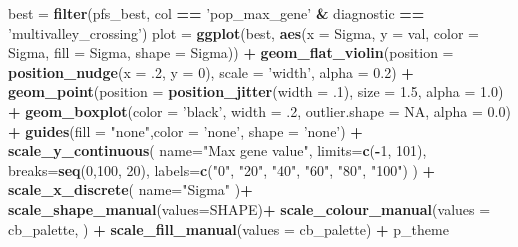 \documentclass[]{book}
\newenvironment{Shaded}{\begin{snugshade}}{\end{snugshade}}
\newcommand{\DataTypeTok}[1]{\textcolor[rgb]{0.13,0.29,0.53}{#1}}
\newcommand{\DecValTok}[1]{\textcolor[rgb]{0.00,0.00,0.81}{#1}}
\newcommand{\FloatTok}[1]{\textcolor[rgb]{0.00,0.00,0.81}{#1}}
\newcommand{\KeywordTok}[1]{\textcolor[rgb]{0.13,0.29,0.53}{\textbf{#1}}}
\newcommand{\NormalTok}[1]{#1}
\newcommand{\OperatorTok}[1]{\textcolor[rgb]{0.81,0.36,0.00}{\textbf{#1}}}
\newcommand{\OtherTok}[1]{\textcolor[rgb]{0.56,0.35,0.01}{#1}}
\newcommand{\StringTok}[1]{\textcolor[rgb]{0.31,0.60,0.02}{#1}}
\begin{document}
\begin{Shaded}
\begin{Highlighting}[]
\NormalTok{best =}\StringTok{ }\KeywordTok{filter}\NormalTok{(pfs_best, col }\OperatorTok{==}\StringTok{ 'pop_max_gene'} \OperatorTok{&}\StringTok{ }\NormalTok{diagnostic }\OperatorTok{==}\StringTok{ 'multivalley_crossing'}\NormalTok{)}
\NormalTok{plot =}\StringTok{  }\KeywordTok{ggplot}\NormalTok{(best, }\KeywordTok{aes}\NormalTok{(}\DataTypeTok{x =}\NormalTok{ Sigma, }\DataTypeTok{y =}\NormalTok{ val, }\DataTypeTok{color =}\NormalTok{ Sigma, }\DataTypeTok{fill =}\NormalTok{ Sigma, }\DataTypeTok{shape =}\NormalTok{ Sigma)) }\OperatorTok{+}
\StringTok{          }\KeywordTok{geom_flat_violin}\NormalTok{(}\DataTypeTok{position =} \KeywordTok{position_nudge}\NormalTok{(}\DataTypeTok{x =} \FloatTok{.2}\NormalTok{, }\DataTypeTok{y =} \DecValTok{0}\NormalTok{), }\DataTypeTok{scale =} \StringTok{'width'}\NormalTok{, }\DataTypeTok{alpha =} \FloatTok{0.2}\NormalTok{) }\OperatorTok{+}
\StringTok{          }\KeywordTok{geom_point}\NormalTok{(}\DataTypeTok{position =} \KeywordTok{position_jitter}\NormalTok{(}\DataTypeTok{width =} \FloatTok{.1}\NormalTok{), }\DataTypeTok{size =} \FloatTok{1.5}\NormalTok{, }\DataTypeTok{alpha =} \FloatTok{1.0}\NormalTok{) }\OperatorTok{+}
\StringTok{          }\KeywordTok{geom_boxplot}\NormalTok{(}\DataTypeTok{color =} \StringTok{'black'}\NormalTok{, }\DataTypeTok{width =} \FloatTok{.2}\NormalTok{, }\DataTypeTok{outlier.shape =} \OtherTok{NA}\NormalTok{, }\DataTypeTok{alpha =} \FloatTok{0.0}\NormalTok{) }\OperatorTok{+}
\StringTok{          }\KeywordTok{guides}\NormalTok{(}\DataTypeTok{fill =} \StringTok{"none"}\NormalTok{,}\DataTypeTok{color =} \StringTok{'none'}\NormalTok{, }\DataTypeTok{shape =} \StringTok{'none'}\NormalTok{) }\OperatorTok{+}
\StringTok{          }\KeywordTok{scale_y_continuous}\NormalTok{(}
          \DataTypeTok{name=}\StringTok{"Max gene value"}\NormalTok{,}
          \DataTypeTok{limits=}\KeywordTok{c}\NormalTok{(}\OperatorTok{-}\DecValTok{1}\NormalTok{, }\DecValTok{101}\NormalTok{),}
          \DataTypeTok{breaks=}\KeywordTok{seq}\NormalTok{(}\DecValTok{0}\NormalTok{,}\DecValTok{100}\NormalTok{, }\DecValTok{20}\NormalTok{),}
          \DataTypeTok{labels=}\KeywordTok{c}\NormalTok{(}\StringTok{"0"}\NormalTok{, }\StringTok{"20"}\NormalTok{, }\StringTok{"40"}\NormalTok{, }\StringTok{"60"}\NormalTok{, }\StringTok{"80"}\NormalTok{, }\StringTok{"100"}\NormalTok{)}
\NormalTok{          ) }\OperatorTok{+}
\StringTok{          }\KeywordTok{scale_x_discrete}\NormalTok{(}
            \DataTypeTok{name=}\StringTok{"Sigma"}
\NormalTok{          )}\OperatorTok{+}
\StringTok{          }\KeywordTok{scale_shape_manual}\NormalTok{(}\DataTypeTok{values=}\NormalTok{SHAPE)}\OperatorTok{+}
\StringTok{          }\KeywordTok{scale_colour_manual}\NormalTok{(}\DataTypeTok{values =}\NormalTok{ cb_palette, ) }\OperatorTok{+}
\StringTok{          }\KeywordTok{scale_fill_manual}\NormalTok{(}\DataTypeTok{values =}\NormalTok{ cb_palette) }\OperatorTok{+}
\StringTok{          }\NormalTok{p_theme}


\end{Highlighting}
\end{Shaded}
\end{document}

